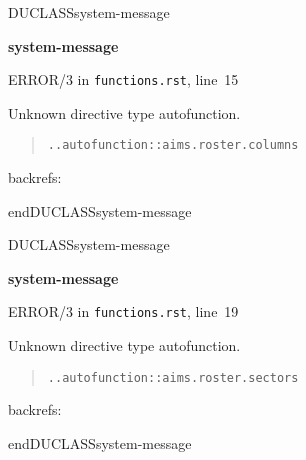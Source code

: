 \documentclass[a4paper]{article}
\newenvironment{DUclass}[1]%
  {%
   \def\DocutilsClassFunctionName{DUCLASS#1}
     \csname \DocutilsClassFunctionName \endcsname}%
  {\csname end\DocutilsClassFunctionName \endcsname}%
\newenvironment{DUadmonition}%
  {\begin{center}
     \begin{lrbox}{\DUadmonitionbox}
       \begin{minipage}{0.9\linewidth}
  }%
  {    \end{minipage}
     \end{lrbox}
     \fbox{\usebox{\DUadmonitionbox}}
   \end{center}
  }
\newenvironment{DUlineblock}[1]{%
    \list{}{\setlength{\partopsep}{\parskip}
            \addtolength{\partopsep}{\baselineskip}
            \setlength{\topsep}{0pt}
            \setlength{\itemsep}{0.15\baselineskip}
            \setlength{\parsep}{0pt}
            \setlength{\leftmargin}{#1}}
    \raggedright
  }
  {\endlist}
\providecommand*{\DUtitle}[1]{%
  \smallskip\noindent\textbf{#1}\smallskip}
\begin{document}
\begin{DUlineblock}{0em}
\item[] 
\end{DUlineblock}

\begin{DUclass}{system-message}
\begin{DUadmonition}
\DUtitle{system-message
}

{\color{red}ERROR/3} in \texttt{functions.rst}, line~15

Unknown directive type \textquotedbl{}autofunction\textquotedbl{}.

\begin{quote}
\begin{alltt}
.. autofunction:: aims.roster.columns

\end{alltt}
\end{quote}
backrefs: \end{DUadmonition}
\end{DUclass}

\begin{DUlineblock}{0em}
\item[] 
\end{DUlineblock}

\begin{DUclass}{system-message}
\begin{DUadmonition}
\DUtitle{system-message
}

{\color{red}ERROR/3} in \texttt{functions.rst}, line~19

Unknown directive type \textquotedbl{}autofunction\textquotedbl{}.

\begin{quote}
\begin{alltt}
.. autofunction:: aims.roster.sectors

\end{alltt}
\end{quote}
backrefs: \end{DUadmonition}
\end{DUclass}

\begin{DUlineblock}{0em}
\item[] 
\end{DUlineblock}
\end{document}
